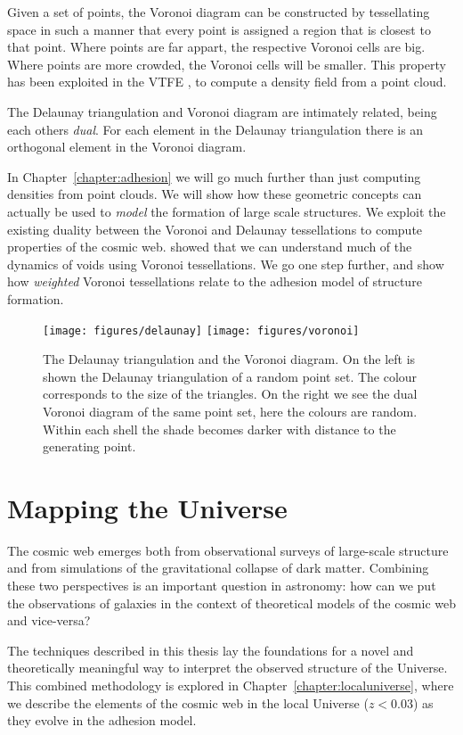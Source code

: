 Given a set of points, the Voronoi diagram can be constructed by tessellating space in such a manner that every point is assigned a region that is closest to that point. Where points are far appart, the respective Voronoi cells are big. Where points are more crowded, the Voronoi cells will be smaller. This property has been exploited in the \ac{VTFE} \citep{Neyrinck2005}, to compute a density field from a point cloud.

The Delaunay triangulation and Voronoi diagram are intimately related, being each others \emph{dual}. For each element in the Delaunay triangulation there is an orthogonal element in the Voronoi diagram.

In Chapter~\ref{chapter:adhesion} we will go much further than just computing densities from point clouds. We will show how these geometric concepts can actually be used to \emph{model} the formation of large scale structures. We exploit the existing duality between the Voronoi and Delaunay tessellations to compute properties of the cosmic web. \citet{Weygaert1991} showed that we can understand much of the dynamics of voids using Voronoi tessellations. We go one step further, and show how \emph{weighted} Voronoi tessellations relate to the adhesion model of structure formation.


\begin{figure}
    \centering
    \texttt{[image: figures/delaunay]}
    \texttt{[image: figures/voronoi]}
    \caption{The Delaunay triangulation and the Voronoi diagram. On the left is shown the Delaunay triangulation of a random point set. The colour corresponds to the size of the triangles. On the right we see the dual Voronoi diagram of the same point set, here the colours are random. Within each shell the shade becomes darker with distance to the generating point.} \label{fig:delvor}
\end{figure}

\section{Mapping the Universe}
The cosmic web emerges both from observational surveys of large-scale structure and from simulations of the gravitational collapse of dark matter.
Combining these two perspectives is an important question in astronomy: how can we put the observations of galaxies in the context of theoretical models of the cosmic web and vice-versa?

The techniques described in this thesis lay the foundations for a novel and theoretically meaningful way to interpret the observed structure of the Universe.
This combined methodology is explored in Chapter~\ref{chapter:localuniverse}, where we describe the elements of the cosmic web in the local Universe ($z < 0.03$) as they evolve in the adhesion model.

